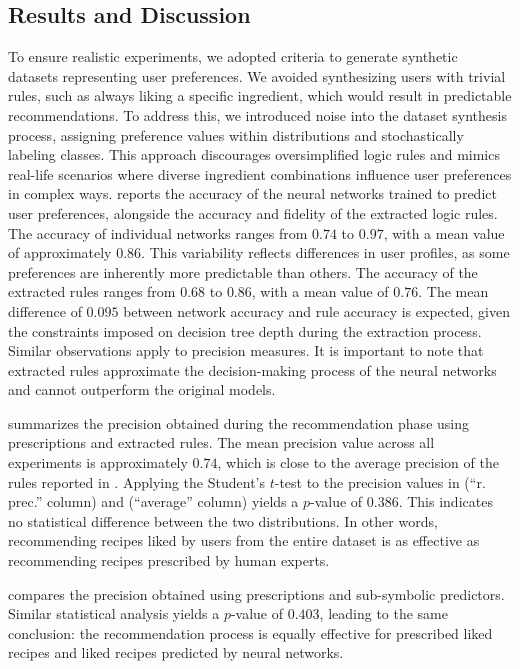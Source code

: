 \subsection{Results and Discussion}\label{subsec:results-and-discussion}
%
To ensure realistic experiments, we adopted criteria to generate synthetic datasets representing user preferences.
%
We avoided synthesizing users with trivial rules, such as always liking a specific ingredient, which would result in predictable recommendations.
%
To address this, we introduced noise into the dataset synthesis process, assigning preference values within distributions and stochastically labeling classes.
%
This approach discourages oversimplified logic rules and mimics real-life scenarios where diverse ingredient combinations influence user preferences in complex ways.
%
 reports the accuracy of the neural networks trained to predict user preferences, alongside the accuracy and fidelity of the extracted logic rules.
%
The accuracy of individual networks ranges from \(0.74\) to \(0.97\), with a mean value of approximately \(0.86\).
%
This variability reflects differences in user profiles, as some preferences are inherently more predictable than others.
%
The accuracy of the extracted rules ranges from \(0.68\) to \(0.86\), with a mean value of \(0.76\).
%
The mean difference of \(0.095\) between network accuracy and rule accuracy is expected, given the constraints imposed on decision tree depth during the extraction process.
%
Similar observations apply to precision measures.
%
It is important to note that extracted rules approximate the decision-making process of the neural networks and cannot outperform the original models.

 summarizes the precision obtained during the recommendation phase using prescriptions and extracted rules.
%
The mean precision value across all experiments is approximately \(0.74\), which is close to the average precision of the rules reported in .
%
Applying the Student's \(t\)-test to the precision values in  (``r. prec.'' column) and  (``average'' column) yields a \(p\)-value of \(0.386\).
%
This indicates no statistical difference between the two distributions.
%
In other words, recommending recipes liked by users from the entire dataset is as effective as recommending recipes prescribed by human experts.

 compares the precision obtained using prescriptions and sub-symbolic predictors.
%
Similar statistical analysis yields a \(p\)-value of \(0.403\), leading to the same conclusion: the recommendation process is equally effective for prescribed liked recipes and liked recipes predicted by neural networks.

